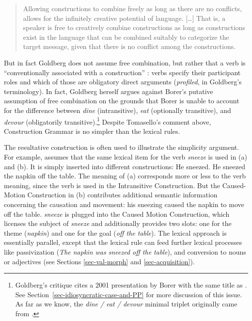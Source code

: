 \begin{quote}
Allowing constructions to combine freely as long as there are no
conflicts, allows for the infinitely creative potential of language.
[\ldots] That is, a speaker is free to creatively combine constructions as
long as constructions exist in the language that can be combined
suitably to categorize the target message, given that there is no
conflict among the constructions.  \citep[]{Goldberg2006a} 
\end{quote}

\noindent
But in fact Goldberg does not assume free combination, but rather that a verb is ``conventionally
associated with a construction'' \citep[]{Goldberg95a}: verbs specify their participant roles and which
of those are obligatory direct arguments (\emph{profiled}, in Goldberg's terminology).  In fact, Goldberg herself \citeyearpar[]{Goldberg2006a}
argues against Borer's putative assumption of free combination \citeyearpar{Borer2003a-u} on the grounds that Borer is
unable to account for the difference between \emph{dine} (intransitive), \emph{eat} (optionally
transitive), and \emph{devour} (obligatorily transitive).\footnote{Goldberg's critique cites a 2001
  presentation by Borer with the same title as .  See
  Section~\ref{sec-idiosyncratic-case-and-PP} for more discussion of this issue.  As far as
we know, the \emph{dine / eat / devour} minimal triplet originally came from \citet[--90]{Dowty89b-u}. }
Despite Tomasello's comment above,
Construction Grammar is no simpler than the lexical rules.   

The resultative construction is often used to illustrate the simplicity argument.  For example,  
\citet[Chapter~7]{Goldberg95a} assumes that the same lexical item for the verb \emph{sneeze}
is used in (a) and (b). It is simply inserted into different constructions:
\eal
\ex He sneezed.
\ex He sneezed the napkin off the table.
\zl
The meaning of (a) corresponds more or less to the verb meaning, since the verb is used in
the Intransitive Construction. But the Caused-Motion Construction in (b) contributes
additional semantic information concerning the causation and movement: his sneezing caused the
napkin to move off the table.  \emph{sneeze} is plugged into the Caused Motion Construction, which
licenses the subject of \emph{sneeze} and additionally provides two slots: one for the theme
(\emph{napkin}) and one for the goal (\emph{off the table}).  The lexical approach is essentially parallel,
except that the lexical rule can feed further lexical processes like passivization (\emph{The napkin
  was sneezed off the table}), and conversion to nouns or adjectives (see Sections
\ref{sec-val-morph} and \ref{sec-acquisition}).   

